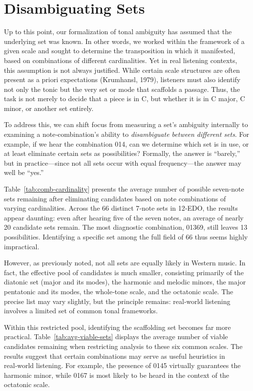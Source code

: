 \documentclass[10pt,twocolumn]{article}
\numberwithin{equation}{section} %
\begin{document}
\section{Disambiguating Sets}

Up to this
point, our formalization of tonal ambiguity has assumed that the underlying set
was known. In other words, we worked within the framework of a given scale and
sought to determine the transposition in which it manifested, based on
combinations of different cardinalities. Yet in real listening contexts, this
assumption is not always justified. While certain scale structures are often
present as a priori expectations (Krumhansl, 1979), listeners must also
identify not only the tonic but the very set or mode that scaffolds a passage.
Thus, the task is not merely to decide that a piece is in C, but whether it is
in C major, C minor, or another set entirely.

To address
this, we can shift focus from measuring a set’s ambiguity internally to
examining a note‑combination’s ability to \textit{disambiguate between different
sets}. For example, if we hear the combination 014, can we determine which
set is in use, or at least eliminate certain sets as possibilities? Formally,
the answer is “barely,” but in practice—since not all sets occur with equal
frequency—the answer may well be “yes.”

Table~\ref{tab:comb-cardinality} presents the average number of possible
seven‑note sets remaining after eliminating candidates based on note
combinations of varying cardinalities. Across the 66 distinct 7‑note sets in 12‑EDO,
the results appear daunting: even after hearing five of the seven notes, an
average of nearly 20 candidate sets remain. The most diagnostic combination,
01369, still leaves 13 possibilities. Identifying a specific set among the full
field of 66 thus seems highly impractical.



However, as
previously noted, not all sets are equally likely in Western music. In fact,
the effective pool of candidates is much smaller, consisting primarily of the
diatonic set (major and its modes), the harmonic and melodic minors, the major
pentatonic and its modes, the whole‑tone scale, and the octatonic scale. The
precise list may vary slightly, but the principle remains: real‑world listening
involves a limited set of common tonal frameworks.

Within this
restricted pool, identifying the scaffolding set becomes far more practical. Table~\ref{tab:avg-viable-sets} displays the average number of viable
candidates remaining when restricting analysis to these six common scales. The
results suggest that certain combinations may serve as useful heuristics in
real‑world listening. For example, the presence of 0145 virtually guarantees
the harmonic minor, while 0167 is most likely to be heard in the context of the
octatonic scale.
\end{document}
